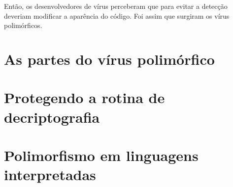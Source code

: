 Então, os desenvolvedores de vírus perceberam que para evitar a detecção deveriam modificar a aparência do código. Foi assim que surgiram os vírus polimórficos.

\section{As partes do vírus polimórfico}

\section{Protegendo a rotina de decriptografia}

\section{Polimorfismo em linguagens interpretadas}
